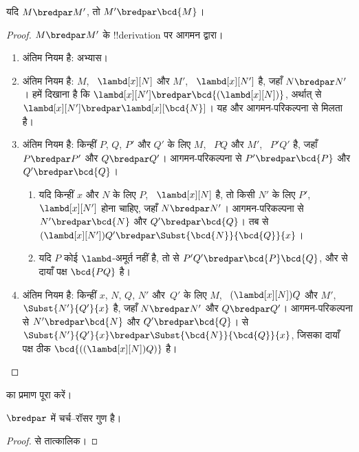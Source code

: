 \documentclass[../../../include/open-logic-section]{subfiles}
\begin{document}
\begin{lem}
  यदि $M \bredpar M'$, तो $M' \bredpar \bcd{M}$।
\end{lem}
\begin{proof}
  $M \bredpar M'$ के !!{derivation} पर आगमन द्वारा।
  \begin{enumerate}
    \item अंतिम नियम  है: अभ्यास।
    \item अंतिम नियम  है: $M$, ~$\lambd[x][N]$ और
      $M'$, ~$\lambd[x][N']$ है, जहाँ $N \bredpar N'$। हमें दिखाना है कि
      $\lambd[x][N'] \bredpar \bcd{(\lambd[x][N])}$, अर्थात्
       से $\lambd[x][N'] \bredpar
      \lambd[x][\bcd{N}]$। यह  और आगमन-परिकल्पना से
      मिलता है।
    \item अंतिम नियम  है: किन्हीं $P$, $Q$, $P'$ और
      $Q'$ के लिए $M$, ~$PQ$ और $M'$, ~$P'Q'$ है, जहाँ $P \bredpar P'$
      और $Q \bredpar Q'$। आगमन-परिकल्पना से $P' \bredpar \bcd{P}$ और $Q'
      \bredpar \bcd{Q}$।
      \begin{enumerate}
        \item यदि किन्हीं $x$ और $N$ के लिए $P$, ~$\lambd[x][N]$ है, तो
          किसी $N'$ के लिए $P'$, ~$\lambd[x][N']$ होना चाहिए, जहाँ $N
          \bredpar N'$। आगमन-परिकल्पना से $N' \bredpar \bcd{N}$ और $Q'
          \bredpar \bcd{Q}$। तब  से
          $(\lambd[x][N'])Q' \bredpar \Subst{\bcd{N}}{\bcd{Q}}{x}$।
        \item यदि $P$ कोई $\lambd$-अमूर्त नहीं है, तो
           से $P'Q' \bredpar \bcd{P}\bcd{Q}$, और
           से दायाँ पक्ष $\bcd{PQ}$ है।
      \end{enumerate}
    \item अंतिम नियम  है: किन्हीं $x$, $N$, $Q$,
      $N'$ और~$Q'$ के लिए $M$, ~$(\lambd[x][N])Q$ और $M'$,
      ~$\Subst{N'}{Q'}{x}$ है, जहाँ $N \bredpar N'$ और $Q \bredpar Q'$।
      आगमन-परिकल्पना से $N' \bredpar \bcd{N}$ और $Q' \bredpar \bcd{Q}$।
       से $\Subst{N'}{Q'}{x} \bredpar
      \Subst{\bcd{N}}{\bcd{Q}}{x}$, जिसका दायाँ पक्ष ठीक
      $\bcd{((\lambd[x][N])Q)}$ है।
  \end{enumerate}
\end{proof}

\begin{prob}
   का प्रमाण पूरा करें।
\end{prob}

\begin{thm}
  $\bredpar$ में चर्च--रॉसर गुण है।
\end{thm}

\begin{proof}
   से तात्कालिक।
\end{proof}
\end{document}
